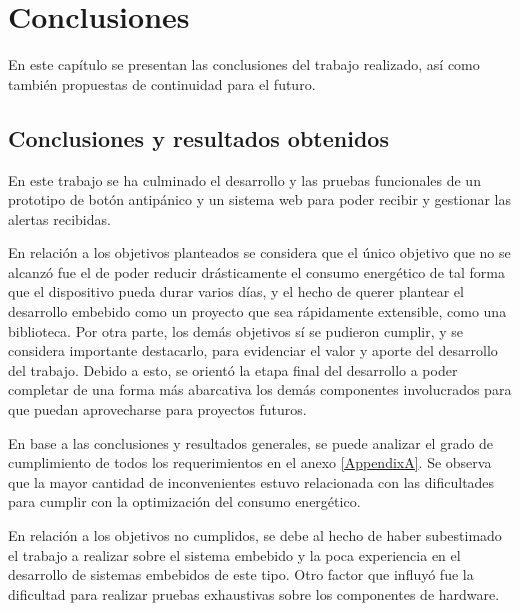 
\chapter{Conclusiones} %

\label{Chapter5} %

En este capítulo se presentan las conclusiones del trabajo realizado, así como también propuestas de continuidad para el futuro.


\section{Conclusiones y resultados obtenidos}

En este trabajo se ha culminado el desarrollo y las pruebas funcionales de un prototipo de botón antipánico y un sistema web para poder recibir y gestionar las alertas recibidas.

En relación a los objetivos planteados se considera que el único objetivo que no se alcanzó fue el de poder reducir drásticamente el consumo energético de tal forma que el dispositivo pueda durar varios días, y el hecho de querer plantear el desarrollo embebido como un proyecto que sea rápidamente extensible, como una biblioteca. Por otra parte, los demás objetivos sí se pudieron cumplir, y se considera importante destacarlo, para evidenciar el valor y aporte del desarrollo del trabajo. Debido a esto, se orientó la etapa final del desarrollo a poder completar de una forma más abarcativa los demás componentes involucrados para que puedan aprovecharse para proyectos futuros.

En base a las conclusiones y resultados generales, se puede analizar el grado de cumplimiento de todos los requerimientos en el anexo \ref{AppendixA}. Se observa que la mayor cantidad de inconvenientes estuvo relacionada con las dificultades para cumplir con la optimización del consumo energético.

En relación a los objetivos no cumplidos, se debe al hecho de haber subestimado el trabajo a realizar sobre el sistema embebido y la poca experiencia en el desarrollo de sistemas embebidos de este tipo. Otro factor que influyó fue la dificultad para realizar pruebas exhaustivas sobre los componentes de hardware.


